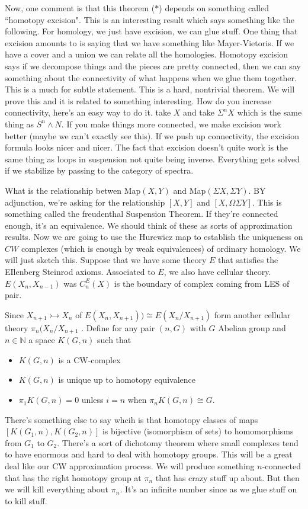 \documentclass[12pt]{article}
\theoremstyle{definition}
\begin{document}
Now, one comment is that this theorem ($\ast$) depends on something called ``homotopy excision". This is an interesting result which says something like the following. For homology, we just have excision, we can glue stuff. One thing that excision amounts to is saying that we have something like Mayer-Vietoris. If we have a cover and a union we can relate all the homologies. Homotopy excision says if we decompose things and the pieces are pretty connected, then we can say something about the connectivity of what happens when we glue them together. This is a much for subtle statement. This is a hard, nontrivial theorem. We will prove this and it is related to something interesting. How do you increase connectivity, here's an easy way to do it. take $X$ and take $\Sigma^n X$ which is the same thing as $S^n\wedge N$. If you make things more connected, we make excision work better (maybe we can't exactly see this). If we push up connectivity, the excision formula looks nicer and nicer. The fact that excision doesn't quite work is the same thing as loops in suspension not quite being inverse. Everything gets solved if we stabilize by passing to the category of spectra. 

What is the relationship betwen \textsf{Map}$(X,Y)$ and \textsf{Map}$(\Sigma X,\Sigma Y)$. BY adjunction, we're asking for the relationship $[X,Y]$ and $[X,\Omega\Sigma Y]$. This is something called the 
freudenthal Suspension Theorem. If they're connected enough, it's an equivalence. We should think of these as sorts of approximation results. Now we are going to use the Hurewicz map to establish the uniqueness on $CW$ complexes (which is enough by weak equivalences) of ordinary homology. We will just sketch this. Suppose that we have some theory $E$ that satisfies the EIlenberg Steinrod axioms. Associated to $E$, we also have cellular theory.  $E(X_n, X_{n-1})$ was $C_n^E(X)$ is the boundary of complex coming from LES of pair. 

Since $X_{n+1}\rightarrowtail X_n$ of $E(X_n,X_{n+1}))\cong E(X_n/X_{n+1})$ form another cellular theory $\pi_n(X_n/X_{n+1}$ . Define for any pair $(n,G)$ with $G$ Abelian group and $n\in \mathbb{N}$ a space $K(G,n)$ such that \begin{itemize}
	\item $K(G,n)$ is a CW-complex
	\item $K(G,n)$ is unique up to homotopy equivalence
	\item $\pi_1K(G,n)=0$ unless $i=n$ when $\pi_n K(G,n)\cong G$. 
\end{itemize}
There's something else to say whcih is that homotopy classes of maps $[K(G_1,n),K(G_2,n)]$ is bijective (isomorphism of sets) to homomorphisms from $G_1$ to $G_2$. There's a sort of dichotomy theorem where small complexes tend to have enormous and hard to deal with homotopy groups. This will be a great deal like our CW approximation process. We will produce something $n$-connected that has the right homotopy group at $\pi_n$ that has crazy stuff up about. But then we will kill everything about $\pi_n$. It's an infinite number since as we glue stuff on to kill stuff.
\end{document}
